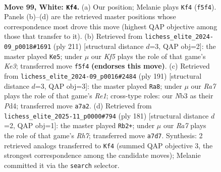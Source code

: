 \documentclass[11pt]{article}
\begin{document}
\clearpage

\begin{figure}[p]\centering
\begin{subfigure}{0.46\textwidth}\centering
\resizebox{\linewidth}{!}{%
\newchessgame
\chessboard[
  setfen={8/R7/3k4/5K2/8/1N6/6P1/7r w - - 62 99},
  showmover=false,
  pgfstyle=straightmove, color=movearrow, markmove={f5-f4}
]}
\caption{}
\end{subfigure}\hfill
\begin{subfigure}{0.46\textwidth}\centering
\resizebox{\linewidth}{!}{%
\newchessgame
\chessboard[
  setfen={3R4/8/4k3/2p5/8/r7/2K5/8 b - - 9 106},
  showmover=false,
  pgfstyle=straightmove, color=movearrow, markmove={e6-e5}
]}
\caption{}
\end{subfigure}
\\[4pt]
\begin{subfigure}{0.46\textwidth}\centering
\resizebox{\linewidth}{!}{%
\newchessgame
\chessboard[
  setfen={4r3/8/2R5/8/P2p4/5K2/3k4/8 b - - 0 96},
  showmover=false,
  pgfstyle=straightmove, color=movearrow, markmove={e8-a8}
]}
\caption{}
\end{subfigure}\hfill
\begin{subfigure}{0.46\textwidth}\centering
\resizebox{\linewidth}{!}{%
\newchessgame
\chessboard[
  setfen={4R3/8/8/8/8/3n1k2/7r/1K6 b - - 13 91},
  showmover=false,
  pgfstyle=straightmove, color=movearrow, markmove={h2-b2}
]}
\caption{}
\end{subfigure}
\caption{\textbf{Move 99, White: \texttt{Kf4}.} (a) Our position; Melanie plays \texttt{Kf4} (\texttt{f5f4}). Panels (b)--(d) are the retrieved master positions whose correspondence most drove this move (highest QAP objective among those that transfer to it). (b) Retrieved from \texttt{lichess\_elite\_2024-09\_p0018\#1691} (ply 211) [structural distance $d$=3, QAP obj=2]: the master played \texttt{Ke5}; under $\mu$ our \emph{Kf5} plays the role of that game's \emph{Ke3}; transferred move \texttt{f5f4} \textbf{(endorses this move)}. (c) Retrieved from \texttt{lichess\_elite\_2024-09\_p0016\#2484} (ply 191) [structural distance $d$=3, QAP obj=3]: the master played \texttt{Ra8}; under $\mu$ our \emph{Ra7} plays the role of that game's \emph{Re1}; cross-type roles: our \emph{N}b3 as their \emph{P}d4; transferred move \texttt{a7a2}. (d) Retrieved from \texttt{lichess\_elite\_2025-11\_p0000\#794} (ply 181) [structural distance $d$=2, QAP obj=1]: the master played \texttt{Rb2+}; under $\mu$ our \emph{Ra7} plays the role of that game's \emph{Rh7}; transferred move \texttt{a7d7}. Synthesis: 2 retrieved analogs transferred to \texttt{Kf4} (summed QAP objective 3, the strongest correspondence among the candidate moves); Melanie committed it via the \texttt{search} selector.}
\label{fig:thought-m196}
\end{figure}
\end{document}
